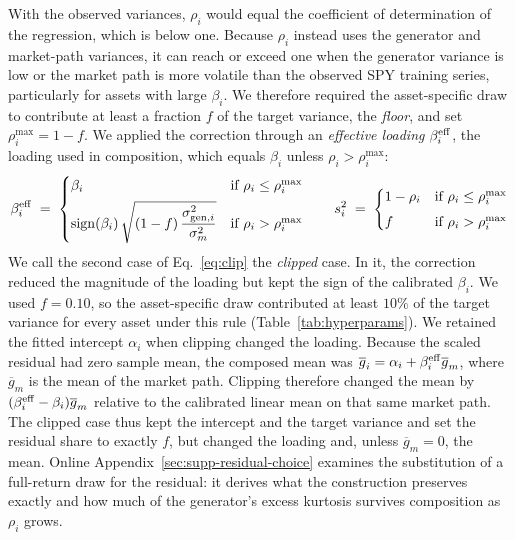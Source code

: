 With the observed variances, $\rho_i$ would equal the coefficient of
determination of the regression, which is below one. Because $\rho_i$
instead uses the generator and market-path variances, it can reach or exceed one when the generator
variance is low or the market path is more volatile than the observed
SPY training series, particularly for assets with large $\beta_i$. We therefore required the asset-specific draw to
contribute at least a fraction $f$ of the target variance, the
\emph{floor}, and set
$\rho_i^{\max}=1-f$. We applied the correction through an
\emph{effective loading} $\beta_i^{\mathrm{eff}}$, the loading used in
composition, which equals $\beta_i$ unless $\rho_i>\rho_i^{\max}$:
\begin{equation}
  \beta_i^{\mathrm{eff}} \;=\;
  \begin{cases}
    \beta_i & \text{if } \rho_i \le \rho_i^{\max} \\[4pt]
    \operatorname{sign}(\beta_i)\,\sqrt{(1 - f)\,\dfrac{\sigma_{\mathrm{gen},i}^2}{\sigma_m^2}} & \text{if } \rho_i > \rho_i^{\max}
  \end{cases}
  \qquad
  s_i^2 \;=\;
  \begin{cases}
    1 - \rho_i & \text{if } \rho_i \le \rho_i^{\max} \\[4pt]
    f          & \text{if } \rho_i > \rho_i^{\max}
  \end{cases}
  \label{eq:clip}
\end{equation}
We call the second case of Eq.~\eqref{eq:clip} the \emph{clipped}
case. In it, the correction reduced the magnitude of the loading but
kept the sign of the calibrated $\beta_i$. We used $f=0.10$, so the asset-specific draw contributed
at least $10\%$ of the target variance for every asset under this rule
(Table~\ref{tab:hyperparams}). We retained the fitted intercept
$\alpha_i$ when clipping changed the loading. Because the scaled
residual had zero sample mean, the composed mean was
$\overline{g}_i=\alpha_i+\beta_i^{\mathrm{eff}}\overline{g}_m$, where
$\overline{g}_m$ is the mean of the market path. Clipping therefore
changed the mean by $(\beta_i^{\mathrm{eff}}-\beta_i)\overline{g}_m$ relative
to the calibrated linear mean on that same market path. The clipped case thus kept the intercept and the target variance and
set the residual share to exactly $f$, but changed the loading and,
unless $\overline{g}_m=0$, the mean. Online
Appendix~\ref{sec:supp-residual-choice} examines the substitution of
a full-return draw for the residual: it derives what the construction
preserves exactly and how much of the generator's excess kurtosis
survives composition as $\rho_i$ grows.

